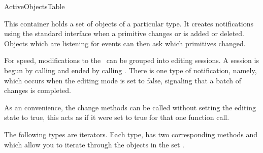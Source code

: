 

\begin{ccRefConcept}{ActiveObjectsTable}  %


\ccDefinition
  

This container holds a set of objects of a particular type. It creates
notifications using the standard  interface when a
primitive changes or is added or deleted. Objects which are listening
for events can then ask which primitives changed.

For speed, modifications to the \ccRefName\ can be grouped into
editing sessions. A session is begun by calling
 and ended by calling .
There is one type of notification, namely, 
which occurs when the editing mode is set to false, signaling that a
batch of changes is completed.

As an convenience, the change methods can be called without setting
the editing state to true, this acts as if it were set to true for
that one function call.

\ccTypes




The following types are iterators. Each type,  has two corresponding methods  and  which allow you to iterate through the objects in the set .




\end{ccRefConcept}
